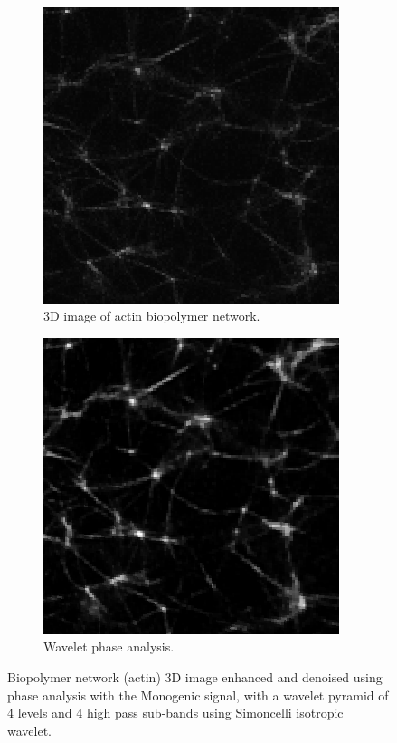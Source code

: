 \begin{figure}[H]
  \centering
  \begin{subfigure}{0.5\textwidth}
    \centering
    \includegraphics[width=0.95\textwidth]{Figures/chapter-image/denoise_actin1_original.png}%
    \caption{3D image of actin biopolymer network.}
    \label{subfig:wavelet_polymer_denoise_original}
  \end{subfigure}%
  \begin{subfigure}{0.5\textwidth}
    \centering
    \includegraphics[width=0.95\textwidth]{Figures/chapter-image/denoise_actin1_wavelet.png}%
    \caption{Wavelet phase analysis.}
    \label{subfig:wavelet_polymer_denoise_wavelet}
  \end{subfigure}
  \caption{Biopolymer network (actin) 3D image enhanced and denoised using phase analysis with the Monogenic signal, with a wavelet pyramid of 4 levels and 4 high pass sub-bands using Simoncelli isotropic wavelet. }
  \label{fig:wavelet_polymer}
\end{figure}
